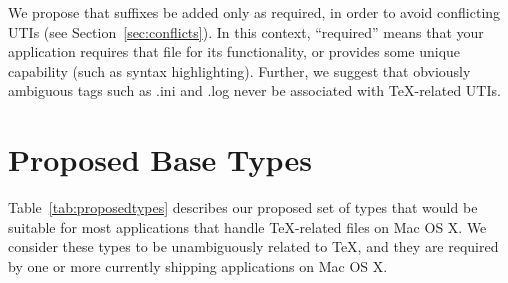 \documentclass[11pt]{article}
\begin{document}
We propose that suffixes be added only as required, in order to avoid
conflicting UTIs (see Section~\ref{sec:conflicts}). In this context,
“required” means that your application requires that file for its
functionality, or provides some unique capability (such as syntax
highlighting). 
Further, we suggest that obviously ambiguous tags such as .ini and .log
never be associated with \TeX -related UTIs.

\section{Proposed Base Types}
Table~\ref{tab:proposedtypes} describes our proposed set of types that
would be suitable for most applications that handle \TeX -related files
on Mac OS X. We consider these types to be unambiguously related to \TeX, 
and they are required by one or more currently shipping applications on
Mac OS X.
\end{document}

